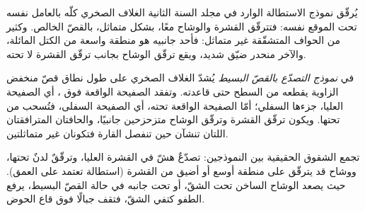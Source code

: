 يُرقّق نموذج الاستطالة الوارد في مجلد السنة الثانية الغلاف الصخري كلّه بالعامل
نفسه تحت الموقع نفسه: فتترقّق القشرة والوشاح معًا،
بشكل متماثل، بالقصّ الخالص. وكثير من الحواف المتشقّقة غير متماثل: فأحد جانبيه
هو منطقة واسعة من الكتل المائلة، والآخر منحدر ضيّق شديد،
ويقع ترقّق الوشاح بجانب ترقّق القشرة لا تحته.

\begin{definition}\label{def:b3:extension-strike-slip:rift-models}
في \emph{نموذج التصدّع بالقصّ البسيط} يُشدّ
الغلاف الصخري على طول نطاق قصّ منخفض الزاوية يقطعه من
السطح حتى قاعدته. وتفقد الصفيحة الواقعة فوق ، أي الصفيحة العليا،
جزءها السفلي؛ أمّا الصفيحة الواقعة تحته، أي الصفيحة السفلى، فتُسحب
من تحتها. ويكون ترقّق القشرة وترقّق الوشاح
متزحزحين جانبيًا، والحافتان المترافقتان اللتان تنشآن حين تنفصل القارة
فتكونان غير متماثلتين.
\end{definition}

تجمع الشقوق الحقيقية بين النموذجين: تصدّعٌ هشّ في القشرة العليا، وترقّقٌ لدنٌ
تحتها، ووشاح قد يترقّق على منطقة أوسع أو أضيق من
القشرة (استطالة تعتمد على العمق). حيث يصعد الوشاح الساخن تحت
الشقّ، أو تحت جانبه في حالة القصّ البسيط، يرفع الطفو
كتفي الشقّ، فتقف جبالًا فوق قاع الحوض.

